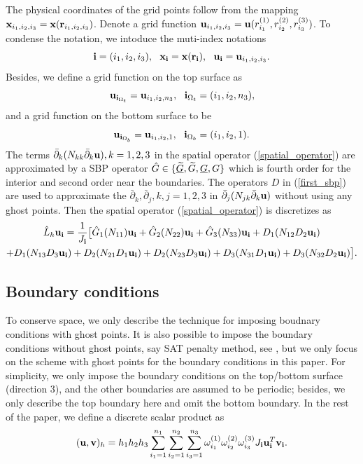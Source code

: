 \documentclass[a4paper]{article}
\newcommand{\wt}{\widetilde}
\begin{document}
The physical coordinates of the grid points follow from the mapping ${\bf x}_{i_1,i_2,i_3} = {\bf x}({\bf r}_{i_1,i_2,i_3})$. Denote a grid function ${\bf u}_{i_1,i_2,i_3} = {\bf u}(r_{i_1}^{(1)},r_{i_2}^{(2)},r_{i_3}^{(3)})$. To condense the notation, we intoduce the muti-index notations
\[{\bf i} = (i_1,i_2,i_3),\ \ {\bf x}_{\bf i} = {\bf x}({\bf r}_{\bf i}),\ \ {\bf u}_{\bf i} = {\bf u}_{i_1,i_2,i_3}.\]
Besides, we define a grid function on the top surface as
\[{\bf u}_{{\bf i}_{\Omega_t}} = {\bf u}_{i_1,i_2,n_3}, \ \ {\bf i}_{\Omega_t} = (i_1,i_2,n_3),\]
and a grid function on the bottom surface to be
\[{\bf u}_{{\bf i}_{\Omega_b}} = {\bf u}_{i_1,i_2,1}, \ \ {\bf i}_{\Omega_b} = (i_1,i_2,1).\]
The terms $\bar{\partial}_k(N_{kk}\bar{\partial}_k{\bf u}), k = 1,2,3$ in the spatial operator (\ref{spatial_operator}) are approximated by a SBP operator $\hat{G}\in\{\uline{\wt G}, \wt{G}, \uline{G}, G\}$ which is fourth order for the interior and  second order near the boundaries. The operators $D$ in  (\ref{first_sbp}) are used to approximate the $\bar{\partial}_k, \bar{\partial}_j, k,j = 1,2,3$ in $\bar{\partial}_j(N_{jk}\bar{\partial}_k{\bf u})$ without using any ghost points. Then the spatial operator (\ref{spatial_operator}) is discretizes as
\begin{multline}\label{discrete_elastic}
\hat{ L}_h{\bf u}_{\bf i} = \frac{1}{J_{\bf i}}\big[\hat{G}_1(N_{11}){\bf u}_{\bf i}+\hat{G}_2(N_{22}){\bf u}_{\bf i}+\hat{G}_3(N_{33}){\bf u}_{\bf i}+D_1(N_{12}D_2{\bf u}_{\bf i})\\
+D_1(N_{13}D_3{\bf u}_{\bf i})+D_2(N_{21}D_1{\bf u}_{\bf i})+D_2(N_{23}D_3{\bf u}_{\bf i})+D_3(N_{31}D_1{\bf u}_{\bf i})
+D_3(N_{32}D_2{\bf u}_{\bf i})\big].
\end{multline}
 
\subsection{Boundary conditions}\label{boundary_conditions}
To conserve space, we only describe the technique for imposing boudnary conditions with ghost points. It is also possible to impose the boundary conditions without ghost points, say SAT penalty method, see \cite{?}, but we only focus on the scheme with ghost points for the boundary conditions in this paper. For simplicity, we only impose the boundary conditions on the top/bottom surface (direction $3$), and the other boundaries are assumed to be periodic; besides, we only describe the top boundary here and omit the bottom boundary. In the rest of the paper, we define a discrete scalar product as
\begin{equation}\label{scalar_product_discrete_interior}
({\bf u}, {\bf v})_h = h_1h_2h_3\sum_{i_1=1}^{n_1}\sum_{i_2=1}^{n_2}\sum_{i_3=1}^{n_3}\omega_{i_1}^{(1)}\omega_{i_2}^{(2)}\omega_{i_3}^{(3)}J_{\bf i}{\bf u}^{T}_{\bf i}{\bf v}_{\bf i}.
\end{equation}
\end{document}
